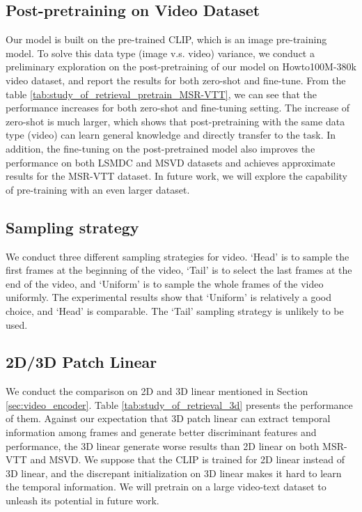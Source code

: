 \documentclass[11pt]{article}
\begin{document}
	\subsection{Post-pretraining on Video Dataset}
	Our model is built on the pre-trained CLIP, which is an image pre-training model. To solve this data type (image v.s. video) variance, we conduct a preliminary exploration on the post-pretraining of our model on Howto100M-380k video dataset, and report the results for both zero-shot and fine-tune. From the table \ref{tab:study_of_retrieval_pretrain_MSR-VTT}, we can see that the performance increases for both zero-shot and fine-tuning setting. The increase of zero-shot is much larger, which shows that post-pretraining with the same data type (video) can learn general knowledge and directly transfer to the task. In addition, the fine-tuning on the post-pretrained model also improves the performance on both LSMDC and MSVD datasets and achieves approximate results for the MSR-VTT dataset. In future work, we will explore the capability of pre-training with an even larger dataset.

	\subsection{Sampling strategy}
	We conduct three different sampling strategies for video. `Head' is to sample the first frames at the beginning of the video, `Tail' is to select the last frames at the end of the video, and `Uniform' is to sample the whole frames of the video uniformly. The experimental results show that `Uniform' is relatively a good choice, and `Head' is comparable. The `Tail' sampling strategy is unlikely to be used.

	\subsection{2D/3D Patch Linear}
	We conduct the comparison on 2D and 3D linear mentioned in Section \ref{sec:video_encoder}. Table \ref{tab:study_of_retrieval_3d} presents the performance of them. Against our expectation that 3D patch linear can extract temporal information among frames and generate better discriminant features and performance, the 3D linear generate worse results than 2D linear on both MSR-VTT and MSVD. We suppose that the CLIP is trained for 2D linear instead of 3D linear, and the discrepant initialization on 3D linear makes it hard to learn the temporal information. We will pretrain on a large video-text dataset to unleash its potential in future work.
\end{document}
